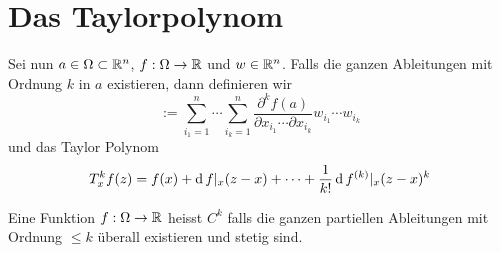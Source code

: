 \section{Das Taylorpolynom}
\begin{Def}
Sei nun $a\in\Omega\subset \mathbb{R}^n$, $f:\Omega\rightarrow \mathbb{R}$ und $w\in\mathbb{R}^n$. 
Falls die ganzen Ableitungen mit Ordnung $k$ in $a$ existieren, dann definieren wir 
\[:=\sum^n_{i_1=1}\cdots\sum^n_{i_k=1}\frac{\partial^kf(a)}{\partial x_{i_1}\cdots\partial x_{i_k}}w_{i_1}\cdots w_{i_k}\]
und das Taylor Polynom 
\[T^k_xf(z)=f(x)+\operatorname{d} f|_x(z-x)+\cdots+\frac{1}{k!}\operatorname{d} f^{(k)}|_x(z-x)^k\]
\end{Def}

\begin{Def}
Eine Funktion $f:\Omega\rightarrow\mathbb{R}$ heisst $C^k$ falls die ganzen 
partiellen Ableitungen mit Ordnung $\leq k$ \"uberall existieren und stetig  
sind.\end{Def}


